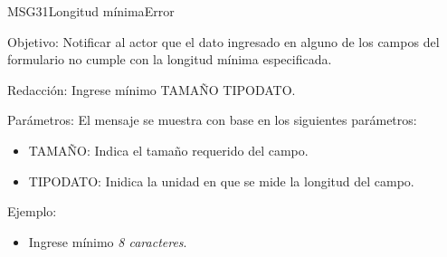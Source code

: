 \begin{mensaje}{MSG31}{Longitud mínima}{Error}
	\item [Objetivo:] Notificar al actor que el dato ingresado en alguno de los campos del formulario no cumple con la longitud mínima especificada.
	\item[Redacción:] Ingrese mínimo TAMAÑO TIPODATO.
	\item[Parámetros:] El mensaje se muestra con base en los siguientes parámetros:
		\begin{itemize}
 			\item TAMAÑO: Indica el tamaño requerido del campo.
 			\item TIPODATO: Inidica la unidad en que se mide la longitud del campo.
		\end{itemize}
	\item[Ejemplo:] 
	\begin{itemize}
		\item Ingrese mínimo {\em 8 caracteres}.
	\end{itemize}
\end{mensaje}